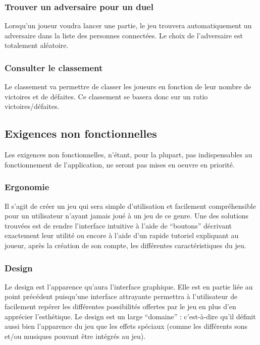 \documentclass[11pt,a4paper]{article}
\begin{document}
\subsubsection*{Trouver un adversaire pour un duel}

Lorsqu'un joueur voudra lancer une partie, le jeu trouvera
automatiquement un adversaire dans la liste des personnes
connectées. Le choix de l'adversaire est totalement aléatoire.


\subsubsection*{Consulter le classement}

Le classement va permettre de classer les joueurs en fonction de
leur nombre de victoires et de défaites. Ce classement se
basera donc sur un ratio victoires/défaites.


\subsection{Exigences non fonctionnelles}
\label{sec:exi-nonfonc}

Les exigences non fonctionnelles, n'étant, pour la plupart, pas indispensables au fonctionnement de l'application, ne seront pas mises en oeuvre en priorité.


\subsubsection*{Ergonomie}
Il s'agit de créer un jeu qui sera simple d'utilisation et facilement compréhensible pour un utilisateur n'ayant jamais joué à un jeu de ce genre.
\medbreak
Une des solutions trouvées est de rendre l'interface intuitive à l'aide de ``boutons'' décrivant exactement leur utilité ou encore à l'aide d'un rapide tutoriel expliquant au joueur, après la création de son compte, les différentes caractéristiques du jeu.


\subsubsection*{Design}
Le design est l'apparence qu'aura l'interface graphique. Elle est en partie liée au point précédent puisqu'une interface attrayante permettra à l'utilisateur de facilement repérer les différentes possibilités offertes par le jeu en plus d'en apprécier l'esthétique.
\medbreak
Le design est un large ``domaine'' : c'est-à-dire qu'il définit aussi bien l'apparence du jeu  que les effets spéciaux (comme les différents sons et/ou musiques pouvant être intégrés au jeu).
\end{document}

